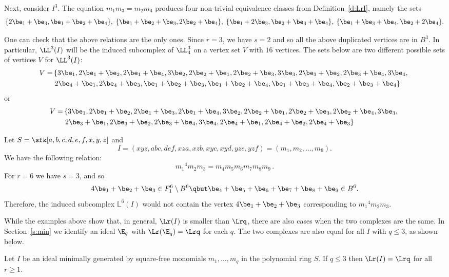 \begin{exam}
Next, consider $I^3$. The equation $m_1m_3=m_2m_4$ produces four
non-trivial equivalence classes from Definition~\ref{d:LrI}, namely the sets
{\small $$ \{ 2\be_1+\be_3, \be_1+\be_2+\be_4\}, \; \{ \be_1+\be_2+\be_3, 2\be_2+\be_4\}, \; \{\be_1+2\be_3, \be_2+\be_3+\be_4\}, 
\; \{\be_1+\be_3+\be_4, \be_2+2\be_4\}.$$ }

One can check that the above relations are the only ones. Since $r=3$, we have $s=2$ and so
all the above duplicated vertices are in $B^3$. In particular,
$\LL^3(I)$ will be the induced subcomplex of $\LL_4^3$ on a vertex set
$V$ with $16$ vertices. The sets below are two different possible sets
of vertices $V$ for $\LL^3(I)$:
\begin{align*}
V=&\left\{ 3\be_1, 2\be_1+\be_2, 2\be_1+\be_4, 3\be_2, 2\be_2+\be_1, 2\be_2+\be_3, 3\be_3, 2\be_3+\be_2, 2\be_3+\be_4, 3\be_4, 
\right. \\
&\left. 2\be_4+\be_1, 2\be_4+\be_3, \be_1+\be_2+\be_3, \be_1+\be_2+\be_4, \be_1+\be_3+\be_4, \be_2+\be_3+\be_4 \right\}
\end{align*}
or
\begin{align*}
V=&\left\{ 3\be_1, 2\be_1+\be_2, 2\be_1 + \be_3, 2\be_1+\be_4, 3\be_2, 2\be_2+\be_1, 2\be_2+\be_3, 2\be_2+\be_4, 3\be_3,
\right. \\
&\left. 2\be_3+\be_1,2\be_3+\be_2, 2\be_3+\be_4, 3\be_4, 2\be_4+\be_1, 2\be_4+\be_2, 2\be_4+\be_3 \right\}
\end{align*}
 \end{exam}

\begin{exam}\label{eg:9vars}
Let $S=\sfk[a,b,c,d,e,f,x,y,z]$ and $$I=(xyz, abc, def, xza, xzb, xyc, xyd, yze, yzf) = (m_1,m_2,
\ldots, m_9).$$ We have  the following relation: 
$${m_1}^4m_2m_3 =
m_4m_5m_6m_7m_8m_9\,.$$
For $r=6$ we have
$s=3$, and so $$4\be_1+\be_2+\be_3 \in F_1^6 \setminus B^6 \qbut \be_4+\be_5+\be_6+\be_7+\be_8+\be_9\in B^6.$$
Therefore, the induced subcomplex $\mathbb L^6(I)$ would not contain the vertex
$4\be_1+\be_2+\be_3$ corresponding to ${m_1}^4m_2m_3$.
\end{exam}

While the examples above show that, in general, $\Lr(I)$ is smaller than $\Lrq$, there are also cases when the two complexes are the same.  In Section~\ref{s:min} we identify an ideal $\E_q$ with $\Lr(\E_q)=\Lrq$ for each $q$. 
The two complexes are also equal for all $I$ with $q\le 3$, as shown below. 


\begin{prop} \label{p:Lr=L(I)}
  Let $I$ be an ideal minimally generated by
  square-free monomials $m_1,\ldots,m_q$ in the polynomial ring
  $S$. If $q \leq 3$ then $\Lr(I)=\Lrq$ for all $r \geq 1$.
\end{prop}

